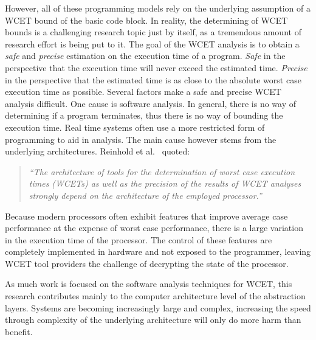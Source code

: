 However, all of these programming models rely on the underlying assumption of a WCET bound of the basic code block. 
In reality, the determining of WCET bounds is a challenging research
topic just by itself, as a tremendous amount of research effort is
being put to it\cite{Wilhelm2008survey}. The goal of the WCET analysis
is to obtain a \textit{safe} and \textit{precise} estimation on the
execution time of a program. \textit{Safe} in the perspective that the
execution time will never exceed the estimated time. \textit{Precise}
in the perspective that the estimated time is as close to the absolute
worst case execution time as possible. Several factors make a safe and
precise WCET analysis difficult. One cause is software analysis. In
general, there is no way of determining if a program terminates, thus
there is no way of bounding the execution time. Real time systems
often use a more restricted form of programming to aid in
analysis. The main cause however stems from the underlying
architectures. Reinhold et al.~\cite{Heckmann2003processor} quoted:
\begin{quote} \textit{ ``The architecture of tools for the
    determination of worst case execution times (WCETs) as well as the
    precision of the results of WCET analyses strongly depend on the
    architecture of the employed processor.''}
\end {quote} Because modern processors often exhibit features that
improve average case performance at the expense of worst case
performance, there is a large variation in the execution time of the
processor. The control of these features are completely implemented in
hardware and not exposed to the programmer, leaving WCET tool
providers the challenge of decrypting the state of the processor. 

As much work is focused on the software analysis techniques for WCET,
this research contributes mainly to the computer architecture level of
the abstraction layers. Systems are becoming increasingly large and
complex, increasing the speed through complexity of the underlying
architecture will only do more harm than
benefit. 
\bigskip 

